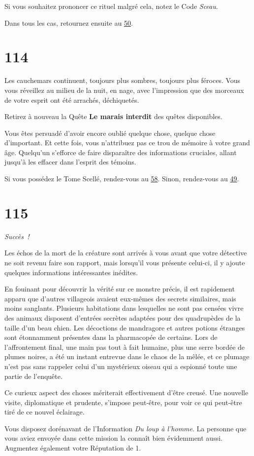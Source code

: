 \documentclass{report}
\newcommand{\gsection}[1]{
    \section{#1}
    \label{section-#1}
}
\newcommand{\glink}[1]{\hyperref[section-#1]{#1}}
\newcommand{\success}{\emph{Succès !}}
\begin{document}
Si vous souhaitez prononcer ce rituel malgré cela, notez le Code \emph{Sceau}.

Dans tous les cas, retournez ensuite au \glink{50}.

\gsection{114}

Les cauchemars continuent, toujours plus sombres, toujours plus féroces. Vous vous réveillez au milieu de la nuit, en nage, avec l'impression que des morceaux de votre esprit ont été arrachés, déchiquetés.

Retirez à nouveau la Quête \textbf{Le marais interdit} des quêtes disponibles.

Vous êtes persuadé d'avoir encore oublié quelque chose, quelque chose d'important. Et cette fois, vous n'attribuez pas ce trou de mémoire à votre grand âge. Quelqu'un s'efforce de faire disparaître des informations cruciales, allant jusqu'à les effacer dans l'esprit des témoins.

Si vous possédez le Tome Scellé, rendez-vous au \glink{58}. Sinon, rendez-vous au \glink{49}.

\gsection{115}

\success

Les échos de la mort de la créature sont arrivés à vous avant que votre détective ne soit revenu faire son rapport, mais lorsqu'il vous présente celui-ci, il y ajoute quelques informations intéressantes inédites.

En fouinant pour découvrir la vérité sur ce monstre précis, il est rapidement apparu que d'autres villageois avaient eux-mêmes des secrets similaires, mais moins sanglants. Plusieurs habitations dans lesquelles ne sont pas censées vivre des animaux disposent d'entrées secrètes adaptées pour des quadrupèdes de la taille d'un beau chien. Les décoctions de mandragore et autres potions étranges sont étonnamment présentes dans la pharmacopée de certains. Lors de l'affrontement final, une main pas tout à fait humaine, plus une serre bordée de plumes noires, a été un instant entrevue dans le chaos de la mêlée, et ce plumage n'est pas sans rappeler celui d'un mystérieux oiseau qui a espionné toute une partie de l'enquête.

Ce curieux aspect des choses mériterait effectivement d'être creusé. Une nouvelle visite, diplomatique et prudente, s'impose peut-être, pour voir ce qui peut-être tiré de ce nouvel éclairage.

Vous disposez dorénavant de l'Information \emph{Du loup à l'homme}. La personne que vous aviez envoyée dans cette mission la connaît bien évidemment aussi. Augmentez également votre Réputation de 1.
\end{document}
